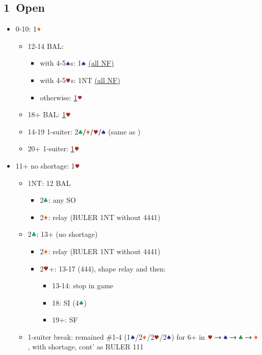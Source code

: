 \documentclass{article}
\begin{document}
\begin{multicols}{2}
\begin{CJK*}{UTF8}{gt}
\section{1\CCC\ Open}\label{sec:1c}
\begin{itemize}
    \item 0-10: 1$\ddd$
    \begin{itemize}
        \item 12-14 BAL:
        \begin{itemize}
            \item with 4-5$\sss$s: 1$\sss$ \hyperref[sec:1c1d-nf]{(all NF)}
            \item with 4-5$\hhh$s: 1NT \hyperref[sec:1c1d-nf]{(all NF)}
            \item otherwise: \hyperref[sec:1c1d1h]{1$\hhh$}
        \end{itemize}
        \item 18+ BAL: \hyperref[sec:1c1d1h]{1$\hhh$}
        \item 14-19 1-suiter: 2$\ccc/\ddd/\hhh/\sss$ (same as )
        \item 20+ 1-suiter: \hyperref[sec:1c1d1h]{1$\hhh$}
    \end{itemize}
    \item 11+ no shortage: 1$\hhh$
    \begin{itemize}
        \item 1NT: 12 BAL
        \begin{itemize}
            \item 2$\ccc$: any SO
            \item 2$\ddd$: relay (RULER 1NT without 4441)
        \end{itemize}
        \item 2$\ccc$: 13+ (no shortage)
        \begin{itemize}
            \item 2$\ddd$: relay (RULER 1NT without 4441)
            \item 2$\hhh$+: 13-17 (444), shape relay and then:
            \begin{itemize}
                \item 13-14: stop in game
                \item 18: SI (4$\ccc$)
                \item 19+: SF
            \end{itemize}
        \end{itemize}
        \item 1-suiter break: remained \#1-4 (1$\sss$/2$\ddd$/2$\hhh$/2$\sss$) for 6+ in $\hscd$, with shortage, cont' as RULER 111

\end{itemize}
\end{itemize}
\end{CJK*}
\end{multicols}
\end{document}
